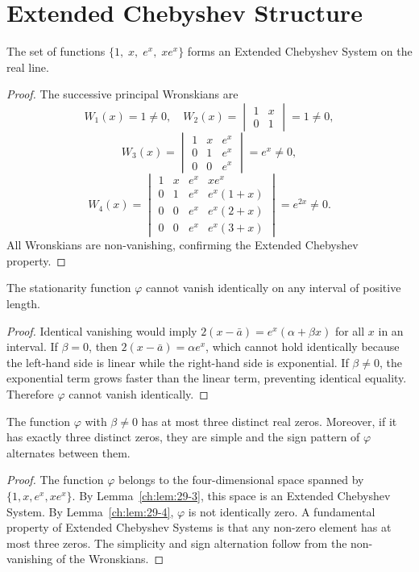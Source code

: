 \section{Extended Chebyshev Structure}\label{ch:sec:extended-chebyshev-structure}
\begin{lemma}
\label{ch:lem:29-3}
The set of functions \(\{1,\;x,\;e^x,\;xe^x\}\) forms an Extended Chebyshev System on the real line.
\end{lemma}
\begin{proof}
The successive principal Wronskians are
\[
W_1(x)=1\neq0,\quad
W_2(x)=
\begin{vmatrix}
1 & x\\ 0 & 1
\end{vmatrix}=1\neq0,
\]
\[
W_3(x)=
\begin{vmatrix}
1 & x & e^x\\
0 & 1 & e^x\\
0 & 0 & e^x
\end{vmatrix}=e^x\neq0,
\]
\[
W_4(x)=
\begin{vmatrix}
1 & x & e^x & xe^x\\
0 & 1 & e^x & e^x(1+x)\\
0 & 0 & e^x & e^x(2+x)\\
0 & 0 & e^x & e^x(3+x)
\end{vmatrix}=e^{2x}\neq0.
\]
All Wronskians are non-vanishing, confirming the Extended Chebyshev property. 
\end{proof}
\begin{lemma}
\label{ch:lem:29-4}
The stationarity function \(\varphi\) cannot vanish identically on any interval of positive length.
\end{lemma}
\begin{proof}
Identical vanishing would imply \(2(x-\bar a)=e^x(\alpha+\beta x)\) for all \(x\) in an interval. If \(\beta=0\), then \(2(x-\bar a)=\alpha e^x\), which cannot hold identically because the left-hand side is linear while the right-hand side is exponential. If \(\beta\neq0\), the exponential term grows faster than the linear term, preventing identical equality. Therefore \(\varphi\) cannot vanish identically. 
\end{proof}
\begin{lemma}
\label{ch:lem:29-5}
The function \(\varphi\) with \(\beta\neq0\) has at most three distinct real zeros. Moreover, if it has exactly three distinct zeros, they are simple and the sign pattern of \(\varphi\) alternates between them.
\end{lemma}
\begin{proof}
The function \(\varphi\) belongs to the four-dimensional space spanned by \(\{1,x,e^x,xe^x\}\). By Lemma~\ref{ch:lem:29-3}, this space is an Extended Chebyshev System. By Lemma~\ref{ch:lem:29-4}, \(\varphi\) is not identically zero. A fundamental property of Extended Chebyshev Systems is that any non-zero element has at most three zeros. The simplicity and sign alternation follow from the non-vanishing of the Wronskians. 
\end{proof}
